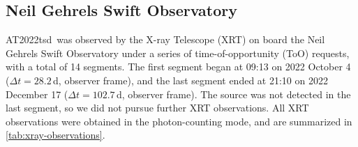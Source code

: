 \documentclass{nature_plusfigure}
\newcommand{\at}{AT2022tsd}
\begin{document}
\begin{methods}



\subsection{Neil Gehrels Swift Observatory}
\label{Methods:Swift}

\at\ was observed by the X-ray Telescope (XRT\cite{Burrows2005}) on board the Neil Gehrels Swift Observatory under a series of time-of-opportunity (ToO) requests, with a total of 14 segments. The first segment began at 09:13 on 2022 October 4 ($\Delta t=28.2\,$d, observer frame), and the last segment ended at 21:10 on 2022 December 17 ($\Delta t=102.7\,$d, observer frame). The source was not detected in the last segment, so we did not pursue further XRT observations.
All XRT observations were obtained in the photon-counting mode, and are summarized in \ref{tab:xray-observations}.


\end{methods}
\end{document}
